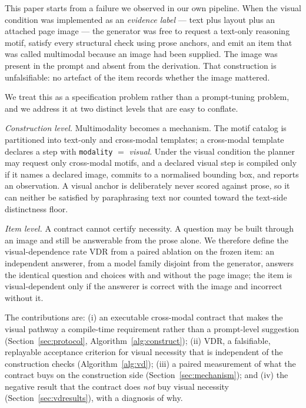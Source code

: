 \documentclass[conference]{IEEEtran}
\newcommand{\vdrate}{\mathrm{VDR}}
\begin{document}
This paper starts from a failure we observed in our own pipeline. When the visual
condition was implemented as an \emph{evidence label} --- text plus layout plus an
attached page image --- the generator was free to request a text-only reasoning
motif, satisfy every structural check using prose anchors, and emit an item that
was called multimodal because an image had been supplied. The image was present in
the prompt and absent from the derivation. That construction is unfalsifiable: no
artefact of the item records whether the image mattered.

We treat this as a specification problem rather than a prompt-tuning problem, and
we address it at two distinct levels that are easy to conflate.

\emph{Construction level.} Multimodality becomes a mechanism. The motif catalog is
partitioned into text-only and cross-modal templates; a cross-modal template
declares a step with \texttt{modality} $=$ \emph{visual}. Under the visual
condition the planner may request only cross-modal motifs, and a declared visual
step is compiled only if it names a declared image, commits to a normalised
bounding box, and reports an observation. A visual anchor is deliberately never
scored against prose, so it can neither be satisfied by paraphrasing text nor
counted toward the text-side distinctness floor.

\emph{Item level.} A contract cannot certify necessity. A question may be built
through an image and still be answerable from the prose alone. We therefore define
the visual-dependence rate $\vdrate$ from a paired ablation on the frozen item:
an independent answerer, from a model family disjoint from the generator, answers
the identical question and choices with and without the page image; the item is
visual-dependent only if the answerer is correct with the image and incorrect
without it.

The contributions are: (i) an executable cross-modal contract that makes the
visual pathway a compile-time requirement rather than a prompt-level suggestion
(Section~\ref{sec:protocol}, Algorithm~\ref{alg:construct});
(ii) $\vdrate$, a falsifiable, replayable acceptance criterion for visual
necessity that is independent of the construction checks
(Algorithm~\ref{alg:vd}); (iii) a paired measurement of what the contract buys on
the construction side (Section~\ref{sec:mechanism}); and (iv) the negative result
that the contract does \emph{not} buy visual necessity
(Section~\ref{sec:vdresults}), with a diagnosis of why.
\end{document}
